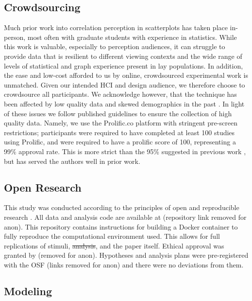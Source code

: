 \documentclass[manuscript, review, anonymous, screen]{acmart}
\providecommand{\DIFaddtex}[1]{{\protect\color{blue}\uwave{#1}}} %
\providecommand{\DIFdeltex}[1]{{\protect\color{red}\sout{#1}}}                      %
\providecommand{\DIFaddbegin}{} %
\providecommand{\DIFaddend}{} %
\providecommand{\DIFdelbegin}{} %
\providecommand{\DIFdelend}{} %
\providecommand{\DIFadd}[1]{\texorpdfstring{\DIFaddtex{#1}}{#1}} %
\providecommand{\DIFdel}[1]{\texorpdfstring{\DIFdeltex{#1}}{}} %
\newcommand{\DIFscaledelfig}{0.5}
\newlength{\DIFdelgraphicswidth} %
\newlength{\DIFdelgraphicsheight} %
\newcommand{\DIFaddincludegraphics}[2][]{{\color{blue}\fbox{\DIFOincludegraphics[#1]{#2}}}} %
\newcommand{\DIFdelincludegraphics}[2][]{%
\sbox{\DIFdelgraphicsbox}{\DIFOincludegraphics[#1]{#2}}%
\settoboxwidth{\DIFdelgraphicswidth}{\DIFdelgraphicsbox} %
\settoboxtotalheight{\DIFdelgraphicsheight}{\DIFdelgraphicsbox} %
\scalebox{\DIFscaledelfig}{%
\parbox[b]{\DIFdelgraphicswidth}{\usebox{\DIFdelgraphicsbox}\\[-\baselineskip] \rule{\DIFdelgraphicswidth}{0em}}\llap{\resizebox{\DIFdelgraphicswidth}{\DIFdelgraphicsheight}{%
\setlength{\unitlength}{\DIFdelgraphicswidth}%
\begin{picture}(1,1)%
\thicklines\linethickness{2pt} %
{\color[rgb]{1,0,0}\put(0,0){\framebox(1,1){}}}%
{\color[rgb]{1,0,0}\put(0,0){\line( 1,1){1}}}%
{\color[rgb]{1,0,0}\put(0,1){\line(1,-1){1}}}%
\end{picture}%
}\hspace*{3pt}}} %
} %
\DeclareRobustCommand{\DIFaddbegin}{\DIFOaddbegin \let\includegraphics\DIFaddincludegraphics} %
\DeclareRobustCommand{\DIFaddend}{\DIFOaddend \let\includegraphics\DIFOincludegraphics} %
\DeclareRobustCommand{\DIFdelbegin}{\DIFOdelbegin \let\includegraphics\DIFdelincludegraphics} %
\DeclareRobustCommand{\DIFdelend}{\DIFOaddend \let\includegraphics\DIFOincludegraphics} %
\begin{document}
\DIFaddend \hypertarget{sec-crowdsourcing}{%
\subsection{Crowdsourcing}\label{sec-crowdsourcing}}

Much prior work into correlation perception in scatterplots has taken
place in-person, most often with graduate students with experience in
statistics. While this work is valuable, especially to perception
audiences, it can struggle to provide data that is resilient to
different viewing contexts and the wide range of levels of statistical
and graph experience present in lay populations. In addition, the ease
and low-cost afforded to us by online, crowdsourced experimental work is
unmatched. Given our intended HCI and design audience, we therefore
choose to crowdsource all participants. We acknowledge however, that the
technique has been affected by low quality data and skewed demographics
in the past \citep{chmielewski_2020, charalambides_2021, peer_2021}. In
light of these issues we follow published guidelines \citep{peer_2021}
to ensure the collection of high quality data. Namely, we use the
Prolific.co platform \citep{prolific} with stringent pre-screen
restrictions; participants were required to have completed at least 100
studies using Prolific, and were required to have a prolific score of
100, representing a 99\% approval rate. This is more strict than the
95\% suggested in previous work \citep{peer_2021}, but has served the
authors well in prior work.

\hypertarget{sec-open-research}{%
\subsection{Open Research}\label{sec-open-research}}

This study was conducted according to the principles of open and
reproducible research \citep{ayris_2018}. All data and analysis code are
available at (repository link removed for anon). This repository
contains instructions for building a Docker container to fully reproduce
the computational environment used. This allows for full replications of
stimuli, \DIFdelbegin \DIFdel{analysis}\DIFdelend \DIFaddbegin \DIFadd{analyses}\DIFaddend , and the paper itself. Ethical approval was granted by
(removed for anon). Hypotheses and analysis plans were pre-registered
with the OSF (links removed for anon) and there were no deviations from
them.

\DIFaddbegin \hypertarget{sec-gen-modelling}{%
\subsection{Modeling}\label{sec-gen-modelling}}
\end{document}
